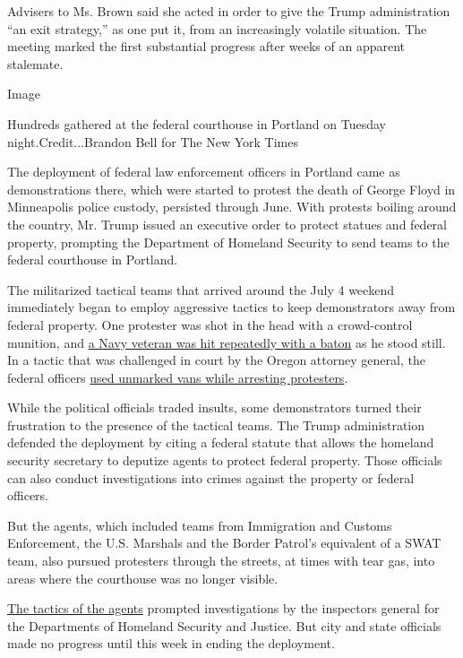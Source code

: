 Advisers to Ms. Brown said she acted in order to give the Trump
administration ``an exit strategy,'' as one put it, from an increasingly
volatile situation. The meeting marked the first substantial progress
after weeks of an apparent stalemate.

Image

Hundreds gathered at the federal courthouse in Portland on Tuesday
night.Credit...Brandon Bell for The New York Times

The deployment of federal law enforcement officers in Portland came as
demonstrations there, which were started to protest the death of George
Floyd in Minneapolis police custody, persisted through June. With
protests boiling around the country, Mr. Trump issued an executive order
to protect statues and federal property, prompting the Department of
Homeland Security to send teams to the federal courthouse in Portland.

The militarized tactical teams that arrived around the July 4 weekend
immediately began to employ aggressive tactics to keep demonstrators
away from federal property. One protester was shot in the head with a
crowd-control munition, and
\href{https://www.nytimes3xbfgragh.onion/2020/07/20/us/portland-protests-navy-christopher-david.html}{a
Navy veteran was hit repeatedly with a baton} as he stood still. In a
tactic that was challenged in court by the Oregon attorney general, the
federal officers
\href{https://www.nytimes3xbfgragh.onion/2020/07/17/us/portland-protests.html}{used
unmarked vans while arresting protesters}.

While the political officials traded insults, some demonstrators turned
their frustration to the presence of the tactical teams. The Trump
administration defended the deployment by citing a federal statute that
allows the homeland security secretary to deputize agents to protect
federal property. Those officials can also conduct investigations into
crimes against the property or federal officers.

But the agents, which included teams from Immigration and Customs
Enforcement, the U.S. Marshals and the Border Patrol's equivalent of a
SWAT team, also pursued protesters through the streets, at times with
tear gas, into areas where the courthouse was no longer visible.

\href{https://www.nytimes3xbfgragh.onion/2020/07/25/us/portland-federal-legal-jurisdiction-courts.html}{The
tactics of the agents} prompted investigations by the inspectors general
for the Departments of Homeland Security and Justice. But city and state
officials made no progress until this week in ending the deployment.

